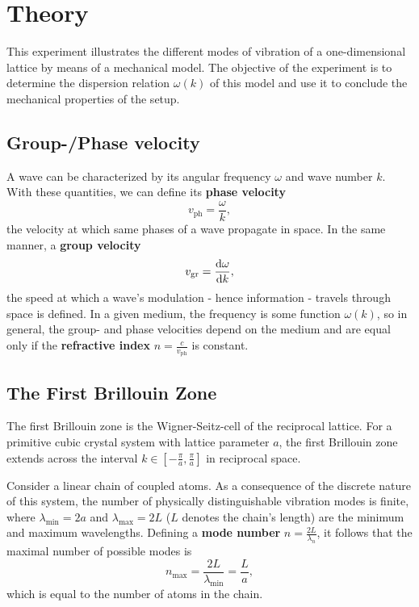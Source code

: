 \chapter{Theory}
This experiment illustrates the different modes of vibration of a one-dimensional lattice by means of a mechanical model.
The objective of the experiment is to determine the dispersion relation $\omega(k)$ of this model and use it to conclude the mechanical properties of the setup.

\section{Group-/Phase velocity}
A wave can be characterized by its angular frequency $\omega$ and wave number $k$.
With these quantities, we can define its \textbf{phase velocity}
\begin{equation*}
	v_\text{ph}=\frac{\omega}{k},
\end{equation*}
the velocity at which same phases of a wave propagate in space.
In the same manner, a \textbf{group velocity}
\begin{equation*}
	v_\text{gr}=\frac{\text{d}\omega}{\text{d} k},
\end{equation*}
the speed at which a wave's modulation - hence information - travels through space is defined.
In a given medium, the frequency is some function $\omega(k)$, so in general, the group- and phase velocities depend on the medium and are equal only if the \textbf{refractive index} $n=\frac{c}{v_\text{ph}}$ is constant.

\section{The First Brillouin Zone}
The first Brillouin zone is the Wigner-Seitz-cell of the reciprocal lattice.
For a primitive cubic crystal system with lattice parameter $a$, the first Brillouin zone extends across the interval $k\in [-\frac{\pi}{a}, \frac{\pi}{a}]$ in reciprocal space.

Consider a linear chain of coupled atoms.
As a consequence of the discrete nature of this system, the number of physically distinguishable vibration modes is finite, where $\lambda_\text{min}=2a$ and $\lambda_\text{max}=2L$ ($L$ denotes the chain's length) are the minimum and maximum wavelengths.
Defining a \textbf{mode number} $n=\frac{2L}{\lambda_n}$, it follows that the maximal number of possible modes is
\begin{equation*}
	n_\text{max}=\frac{2L}{\lambda_\text{min}}=\frac{L}{a},
\end{equation*}
which is equal to the number of atoms in the chain.

